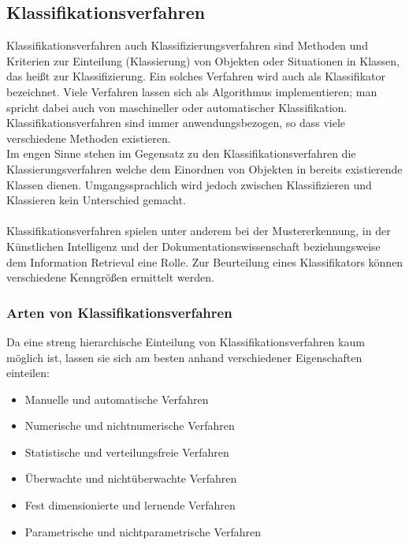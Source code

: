\subsection{Klassifikationsverfahren}
Klassifikationsverfahren auch Klassifizierungsverfahren sind Methoden und Kriterien zur Einteilung (Klassierung) von Objekten oder Situationen in Klassen, das heißt zur Klassifizierung. Ein solches Verfahren wird auch als Klassifikator bezeichnet. Viele Verfahren lassen sich als Algorithmus implementieren; man spricht dabei auch von maschineller oder automatischer Klassifikation. Klassifikationsverfahren sind immer anwendungsbezogen, so dass viele verschiedene Methoden existieren.\\
Im engen Sinne stehen im Gegensatz zu den Klassifikationsverfahren die Klassierungsverfahren welche dem Einordnen von Objekten in bereits existierende Klassen dienen. Umgangssprachlich wird jedoch zwischen Klassifizieren und Klassieren kein Unterschied gemacht.\\
\\
Klassifikationsverfahren spielen unter anderem bei der Mustererkennung, in der Künstlichen Intelligenz und der Dokumentationswissenschaft beziehungsweise dem Information Retrieval eine Rolle. Zur Beurteilung eines Klassifikators können verschiedene Kenngrößen ermittelt werden.

\subsubsection{Arten von Klassifikationsverfahren}
Da eine streng hierarchische Einteilung von Klassifikationsverfahren kaum möglich ist, lassen sie sich am besten anhand verschiedener Eigenschaften einteilen:
\begin{itemize}
\item Manuelle und automatische Verfahren
\item Numerische und nichtnumerische Verfahren
\item Statistische und verteilungsfreie Verfahren
\item Überwachte und nichtüberwachte Verfahren
\item Fest dimensionierte und lernende Verfahren
\item Parametrische und nichtparametrische Verfahren
\end{itemize}

